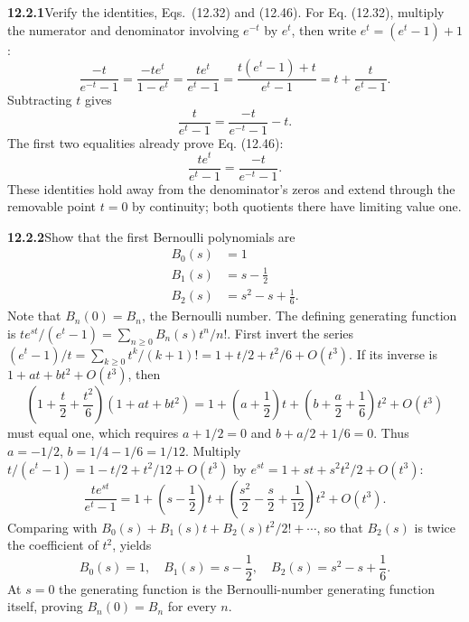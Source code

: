 \par\bigskip
\noindent\textbf{12.2.1}\quad Verify the identities, Eqs.~(12.32) and (12.46).
\solution
For Eq. (12.32), multiply the numerator and denominator involving
$e^{-t}$ by $e^t$, then write $e^t=(e^t-1)+1$:
\[
\frac{-t}{e^{-t}-1}=\frac{-te^t}{1-e^t}=\frac{te^t}{e^t-1}
=\frac{t(e^t-1)+t}{e^t-1}=t+\frac{t}{e^t-1}.
\]
Subtracting $t$ gives
\[
\boxed{\frac{t}{e^t-1}=\frac{-t}{e^{-t}-1}-t}.
\]
The first two equalities already prove Eq. (12.46):
\[
\boxed{\frac{te^t}{e^t-1}=\frac{-t}{e^{-t}-1}}.
\]
These identities hold away from the denominator's zeros and extend
through the removable point $t=0$ by continuity; both quotients there
have limiting value one.

\par\bigskip
\noindent\textbf{12.2.2}\quad Show that the first Bernoulli polynomials are
\begin{align*}
B_{0}(s)&=1\\
B_{1}(s)&=s-\tfrac{1}{2}\\
B_{2}(s)&=s^{2}-s+\tfrac{1}{6}.
\end{align*}
Note that $B_{n}(0)=B_{n}$, the Bernoulli number.
\solution
The defining generating function is
$te^{st}/(e^t-1)=\sum_{n\ge0}B_n(s)t^n/n!$.
First invert the series $(e^t-1)/t=\sum_{k\ge0}t^k/(k+1)!
=1+t/2+t^2/6+O(t^3)$.
If its inverse is $1+at+bt^2+O(t^3)$, then
\[
\left(1+\frac t2+\frac{t^2}6\right)(1+at+bt^2)
=1+\left(a+\frac12\right)t+\left(b+\frac a2+\frac16\right)t^2+O(t^3)
\]
must equal one, which requires
$a+1/2=0$ and $b+a/2+1/6=0$. Thus $a=-1/2$, $b=1/4-1/6=1/12$.
Multiply $t/(e^t-1)=1-t/2+t^2/12+O(t^3)$ by
$e^{st}=1+st+s^2t^2/2+O(t^3)$:
\[
\frac{te^{st}}{e^t-1}
=1+\left(s-\frac12\right)t
+\left(\frac{s^2}{2}-\frac s2+\frac1{12}\right)t^2+O(t^3).
\]
Comparing with $B_0(s)+B_1(s)t+B_2(s)t^2/2!+\cdots$, so that $B_2(s)$ is
twice the coefficient of $t^2$, yields
\[
\boxed{B_0(s)=1,\quad B_1(s)=s-\frac12,\quad
 B_2(s)=s^2-s+\frac16}.
\]
At $s=0$ the generating function is the Bernoulli-number generating
function itself, proving $B_n(0)=B_n$ for every $n$.

